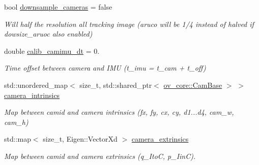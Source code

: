 \begin{DoxyCompactItemize}
bool \hyperlink{structov__init_1_1InertialInitializerOptions_a7bae4984f5ae2416c12a4aa4895018a4}{downsample\+\_\+cameras} = false
\begin{DoxyCompactList}\small\item\em Will half the resolution all tracking image (aruco will be 1/4 instead of halved if dowsize\+\_\+aruoc also enabled) \end{DoxyCompactList}\item 
\mbox{\label{structov__init_1_1InertialInitializerOptions_ac592989c94e0bd68ff372ff29d917018}} 
double \hyperlink{structov__init_1_1InertialInitializerOptions_ac592989c94e0bd68ff372ff29d917018}{calib\+\_\+camimu\+\_\+dt} = 0.
\begin{DoxyCompactList}\small\item\em Time offset between camera and I\+MU (t\+\_\+imu = t\+\_\+cam + t\+\_\+off) \end{DoxyCompactList}\item 
\mbox{\label{structov__init_1_1InertialInitializerOptions_a29e872f770bce934c99712d1bbf7cc21}} 
std\+::unordered\+\_\+map$<$ size\+\_\+t, std\+::shared\+\_\+ptr$<$ \hyperlink{classov__core_1_1CamBase}{ov\+\_\+core\+::\+Cam\+Base} $>$ $>$ \hyperlink{structov__init_1_1InertialInitializerOptions_a29e872f770bce934c99712d1bbf7cc21}{camera\+\_\+intrinsics}
\begin{DoxyCompactList}\small\item\em Map between camid and camera intrinsics (fx, fy, cx, cy, d1...d4, cam\+\_\+w, cam\+\_\+h) \end{DoxyCompactList}\item 
\mbox{\label{structov__init_1_1InertialInitializerOptions_a031126dec2e7db46ae2b0233aa0d9554}} 
std\+::map$<$ size\+\_\+t, Eigen\+::\+Vector\+Xd $>$ \hyperlink{structov__init_1_1InertialInitializerOptions_a031126dec2e7db46ae2b0233aa0d9554}{camera\+\_\+extrinsics}
\begin{DoxyCompactList}\small\item\em Map between camid and camera extrinsics (q\+\_\+\+ItoC, p\+\_\+\+IinC). \end{DoxyCompactList}\item 
\mbox{\label{structov__init_1_1InertialInitializerOptions_a1737eab55d27c05b3663a6b4c908aa6f}} 

\end{DoxyCompactItemize}
